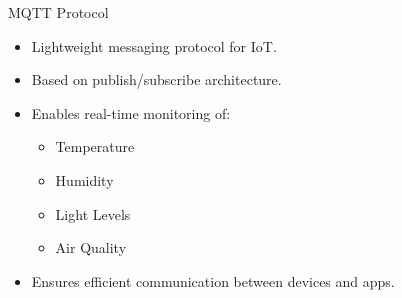\documentclass[aspectratio=169]{beamer}
\begin{document}
\begin{frame}{MQTT Protocol}
\begin{itemize}
    \item Lightweight messaging protocol for IoT.
    \item Based on publish/subscribe architecture.
    \item Enables real-time monitoring of:
    \begin{itemize}
        \item Temperature
        \item Humidity
        \item Light Levels
        \item Air Quality
    \end{itemize}
    \item Ensures efficient communication between devices and apps.
\end{itemize}
\end{frame}
\end{document}
